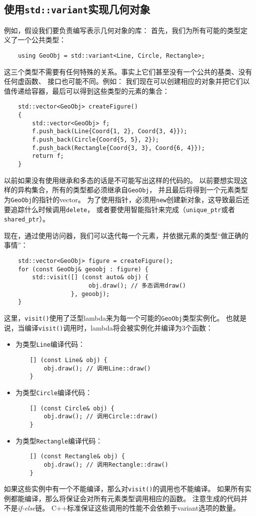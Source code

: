 \subsection{使用\texttt{std::variant}实现几何对象}
例如，假设我们要负责编写表示几何对象的库：
首先，我们为所有可能的类型定义了一个公共类型：
\begin{lstlisting}
    using GeoObj = std::variant<Line, Circle, Rectangle>;
\end{lstlisting}
这三个类型不需要有任何特殊的关系。事实上它们甚至没有一个公共的基类、没有任何虚函数、
接口也可能不同。例如：
我们现在可以创建相应的对象并把它们以值传递给容器，最后可以得到这些类型的元素的集合：
\begin{lstlisting}
    std::vector<GeoObj> createFigure()
    {
        std::vector<GeoObj> f;
        f.push_back(Line{Coord{1, 2}, Coord{3, 4}});
        f.push_back(Circle{Coord{5, 5}, 2});
        f.push_back(Rectangle{Coord{3, 3}, Coord{6, 4}});
        return f;
    }
\end{lstlisting}
以前如果没有使用继承和多态的话是不可能写出这样的代码的。
以前要想实现这样的异构集合，所有的类型都必须继承自\texttt{GeoObj}，
并且最后将得到一个元素类型为\texttt{GeoObj}的指针的vector。
为了使用指针，必须用\texttt{new}创建新对象，这导致最后还要追踪什么时候调用\texttt{delete}，
或者要使用智能指针来完成（\texttt{unique\_ptr}或者\texttt{shared\_ptr}）。

现在，通过使用访问器，我们可以迭代每一个元素，并依据元素的类型“做正确的事情”：
\begin{lstlisting}
    std::vector<GeoObj> figure = createFigure();
    for (const GeoObj& geoobj : figure) {
        std::visit([] (const auto& obj) {
                        obj.draw(); // 多态调用draw()
                   }, geoobj);
    }
\end{lstlisting}
这里，\texttt{visit()}使用了泛型lambda来为每一个可能的\texttt{GeoObj}类型实例化。
也就是说，当编译\texttt{visit()}调用时，lambda将会被实例化并编译为3个函数：
\begin{itemize}
    \item 为类型\texttt{Line}编译代码：
    \begin{lstlisting}
    [] (const Line& obj) {
        obj.draw(); // 调用Line::draw()
    }
    \end{lstlisting}
    \item 为类型\texttt{Circle}编译代码：
    \begin{lstlisting}
    [] (const Circle& obj) {
        obj.draw(); // 调用Circle::draw()
    }
    \end{lstlisting}
    \item 为类型\texttt{Rectangle}编译代码：
    \begin{lstlisting}
    [] (const Rectangle& obj) {
        obj.draw(); // 调用Rectangle::draw()
    }
    \end{lstlisting}
\end{itemize}
如果这些实例中有一个不能编译，那么对\texttt{visit()}的调用也不能编译。
如果所有实例都能编译，那么将保证会对所有元素类型调用相应的函数。
注意生成的代码并不是\emph{if-else}链。
C++标准保证这些调用的性能不会依赖于variant选项的数量。

